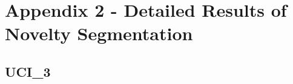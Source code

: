 
%

\chapter{Appendix 2 - Detailed Results of Novelty Segmentation}
\label{app:tables_detailed}

\section{UCI_3}

